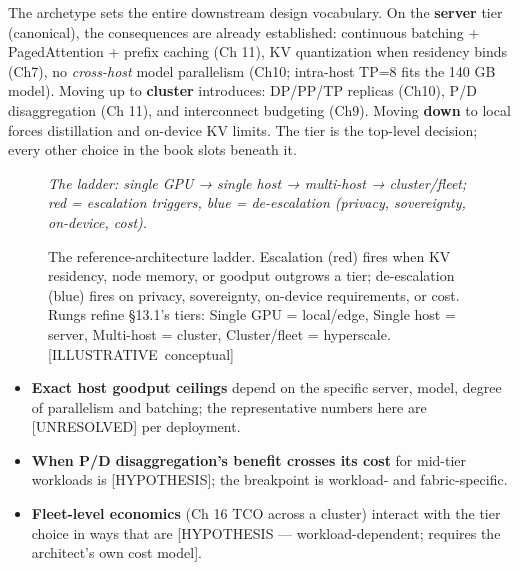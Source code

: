 \label{architecture-consequence}


The archetype sets the entire downstream design vocabulary. On the
\textbf{server} tier (canonical), the consequences are already
established: continuous batching + PagedAttention + prefix caching (Ch
11), KV quantization when residency binds (Ch7), no \emph{cross-host}
model parallelism (Ch10; intra-host TP=8 fits the 140 GB model). Moving
up to \textbf{cluster} introduces: DP/PP/TP replicas (Ch10), P/D
disaggregation (Ch 11), and interconnect budgeting (Ch9). Moving
\textbf{down} to local forces distillation and on-device KV limits. The
tier is the top-level decision; every other choice in the book slots
beneath it.

\begin{figure}
\centering
{}
\caption[The reference-architecture ladder]{The reference-architecture ladder. Escalation (red) fires when KV residency, node memory, or goodput outgrows a tier; de-escalation (blue) fires on privacy, sovereignty, on-device requirements, or cost. Rungs refine §13.1's tiers: Single GPU = local/edge, Single host = server, Multi-host = cluster, Cluster/fleet = hyperscale. \mbox{{[}ILLUSTRATIVE conceptual{]}}}

\label{fig:13.1}\emph{The ladder: single GPU → single host → multi-host → cluster/fleet;
red = escalation triggers, blue = de-escalation (privacy, sovereignty,
on-device, cost).}

\end{figure}\label{what-we-still-dont-know}


\begin{itemize}
\tightlist
\item
  \textbf{Exact host goodput ceilings} depend on the specific server,
  model, degree of parallelism and batching; the representative numbers
  here are \mbox{{[}UNRESOLVED{]}} per deployment.
\item
  \textbf{When P/D disaggregation's benefit crosses its cost} for
  mid-tier workloads is \mbox{{[}HYPOTHESIS{]}}; the breakpoint is workload-
  and fabric-specific.
\item
  \textbf{Fleet-level economics} (Ch 16 TCO across a cluster) interact
  with the tier choice in ways that are {[}HYPOTHESIS ---
  workload-dependent; requires the architect's own cost model{]}.
\end{itemize}

